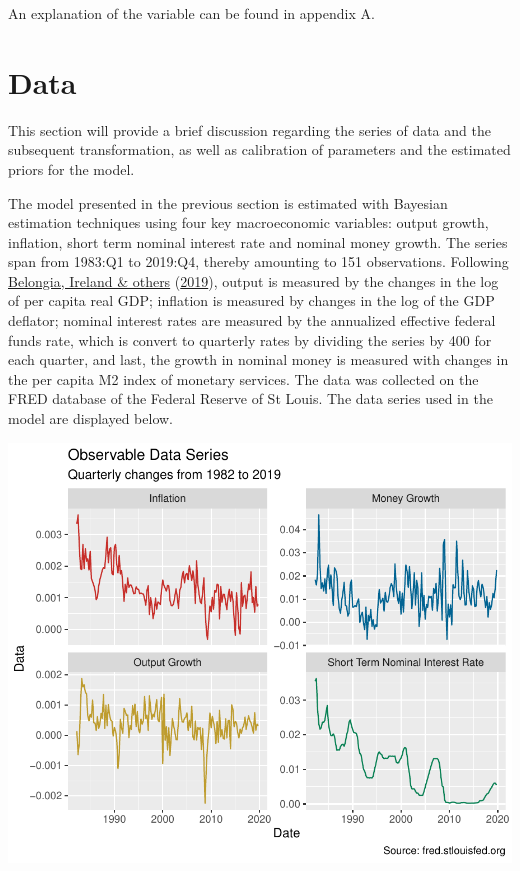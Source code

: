 \documentclass[11pt,preprint, authoryear]{elsarticle}
\numberwithin{equation}{section}
\numberwithin{figure}{section}
\numberwithin{table}{section}
\begin{document}
An explanation of the variable can be found in appendix A.\\
\newpage

\hypertarget{data}{%
\section{Data}\label{data}}

This section will provide a brief discussion regarding the series of
data and the subsequent transformation, as well as calibration of
parameters and the estimated priors for the model.

The model presented in the previous section is estimated with Bayesian
estimation techniques using four key macroeconomic variables: output
growth, inflation, short term nominal interest rate and nominal money
growth. The series span from 1983:Q1 to 2019:Q4, thereby amounting to
151 observations. Following
\protect\hyperlink{ref-belongia2019reconsideration}{Belongia, Ireland \&
others} (\protect\hyperlink{ref-belongia2019reconsideration}{2019}),
output is measured by the changes in the log of per capita real GDP;
inflation is measured by changes in the log of the GDP deflator; nominal
interest rates are measured by the annualized effective federal funds
rate, which is convert to quarterly rates by dividing the series by 400
for each quarter, and last, the growth in nominal money is measured with
changes in the per capita M2 index of monetary services. The data was
collected on the FRED database of the Federal Reserve of St Louis. The
data series used in the model are displayed below.

\includegraphics{Project_TS_20190565_files/figure-latex/unnamed-chunk-1-1.pdf}
\end{document}
